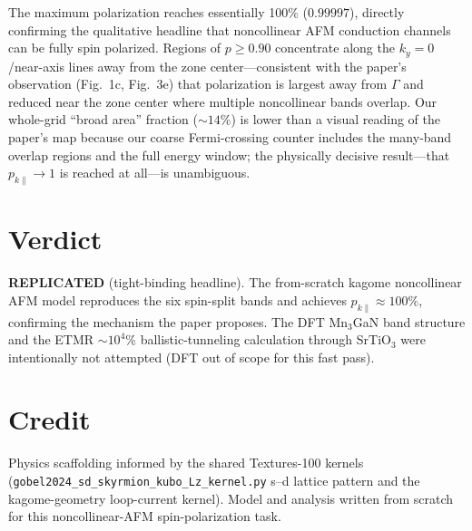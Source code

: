\documentclass[11pt]{article}
\begin{document}
The maximum polarization reaches essentially 100\% ($0.99997$), directly
confirming the qualitative headline that noncollinear AFM conduction channels can
be fully spin polarized. Regions of $p\ge0.90$ concentrate along the
$k_y=0$/near-axis lines away from the zone center---consistent with the paper's
observation (Fig.~1c, Fig.~3e) that polarization is largest away from $\Gamma$ and
reduced near the zone center where multiple noncollinear bands overlap. Our
whole-grid ``broad area'' fraction ($\sim14\%$) is lower than a visual reading of
the paper's map because our coarse Fermi-crossing counter includes the many-band
overlap regions and the full energy window; the physically decisive result---that
$p_{k\parallel}\to1$ is reached at all---is unambiguous.

\section{Verdict}
\textbf{REPLICATED} (tight-binding headline). The from-scratch kagome noncollinear
AFM model reproduces the six spin-split bands and achieves $p_{k\parallel}\approx
100\%$, confirming the mechanism the paper proposes. The DFT Mn$_3$GaN band
structure and the ETMR $\sim10^4\%$ ballistic-tunneling calculation through
SrTiO$_3$ were intentionally not attempted (DFT out of scope for this fast pass).

\section*{Credit}
Physics scaffolding informed by the shared Textures-100 kernels
(\texttt{gobel2024\_sd\_skyrmion\_kubo\_Lz\_kernel.py} s--d lattice pattern and the
kagome-geometry loop-current kernel). Model and analysis written from scratch for
this noncollinear-AFM spin-polarization task.
\end{document}
